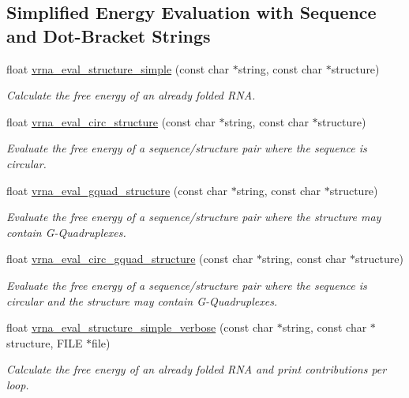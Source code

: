 \subsection*{Simplified Energy Evaluation with Sequence and Dot-\/\+Bracket Strings}
\begin{DoxyCompactItemize}
\item 
float \mbox{\hyperlink{group__eval_ga7e5273464b775d4130245681312c1369}{vrna\+\_\+eval\+\_\+structure\+\_\+simple}} (const char $\ast$string, const char $\ast$structure)
\begin{DoxyCompactList}\small\item\em Calculate the free energy of an already folded R\+NA. \end{DoxyCompactList}\item 
float \mbox{\hyperlink{group__eval_ga3e05a23ddf9b083f4e69881e440d4866}{vrna\+\_\+eval\+\_\+circ\+\_\+structure}} (const char $\ast$string, const char $\ast$structure)
\begin{DoxyCompactList}\small\item\em Evaluate the free energy of a sequence/structure pair where the sequence is circular. \end{DoxyCompactList}\item 
float \mbox{\hyperlink{group__eval_ga3263504825ef4b523eba797c99921df4}{vrna\+\_\+eval\+\_\+gquad\+\_\+structure}} (const char $\ast$string, const char $\ast$structure)
\begin{DoxyCompactList}\small\item\em Evaluate the free energy of a sequence/structure pair where the structure may contain G-\/\+Quadruplexes. \end{DoxyCompactList}\item 
float \mbox{\hyperlink{group__eval_ga9dba2fc5d7e6ad1359a7c2f350589c0e}{vrna\+\_\+eval\+\_\+circ\+\_\+gquad\+\_\+structure}} (const char $\ast$string, const char $\ast$structure)
\begin{DoxyCompactList}\small\item\em Evaluate the free energy of a sequence/structure pair where the sequence is circular and the structure may contain G-\/\+Quadruplexes. \end{DoxyCompactList}\item 
float \mbox{\hyperlink{group__eval_gaf928bfd96767e1b8033a95a4cc432e39}{vrna\+\_\+eval\+\_\+structure\+\_\+simple\+\_\+verbose}} (const char $\ast$string, const char $\ast$structure, F\+I\+LE $\ast$file)
\begin{DoxyCompactList}\small\item\em Calculate the free energy of an already folded R\+NA and print contributions per loop. \end{DoxyCompactList}\item 

\end{DoxyCompactItemize}

